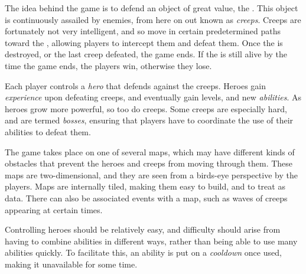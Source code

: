 The idea behind the game is to defend an object of great value, the \objective.
This object is continuously assailed by enemies, from here on out known as \emph{creeps}.
Creeps are fortunately not very intelligent, and so move in certain predetermined
paths toward the \objective, allowing players to intercept them and defeat them.
Once the \objective  is destroyed, or the last creep defeated, the game ends. If
the \objective  is still alive by the time the game ends, the players win,
otherwise they lose.

Each player controls a \emph{hero} that defends against the creeps. Heroes gain
\emph{experience} upon defeating creeps, and eventually gain levels, and new \emph{abilities}.
As heroes grow more powerful, so too do creeps. Some creeps are especially hard, and
are termed \emph{bosses}, ensuring that players have to coordinate the use of their
abilities to defeat them.

The game takes place on one of several maps, which may have different kinds of
obstacles that prevent the heroes and creeps from moving through them. These
maps are two-dimensional, and they are seen from a birds-eye perspective by
the players. Maps are internally tiled, making them easy to build, and to treat
as data. There can also be associated events with a map, such as waves of creeps
appearing at certain times.

Controlling heroes should be relatively easy, and difficulty should arise from
having to combine abilities in different ways, rather than being able to
use many abilities quickly. To facilitate this, an ability is put on a
\emph{cooldown} once used, making it unavailable for some time. 
